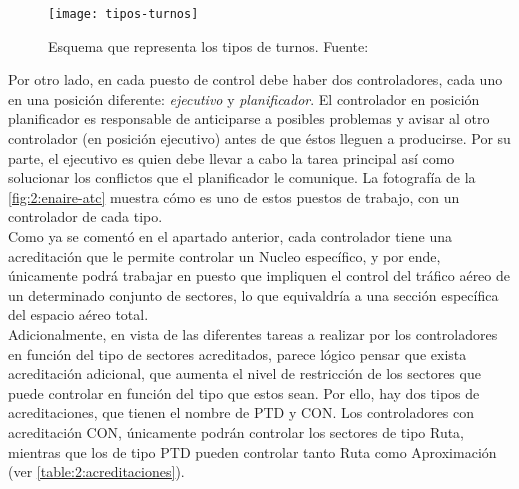 \begin{figure}
    \centering
    \texttt{[image: tipos-turnos]}
    \caption{Esquema que representa los tipos de turnos. Fuente:~\cite{articulo1}}
    \label{fig:2:tipos-turnos}
\end{figure}

Por otro lado, en cada puesto de control debe haber dos controladores, cada uno en una posición diferente: 
\textit{ejecutivo} y \textit{planificador}. El controlador en posición planificador es responsable de anticiparse a 
posibles problemas y avisar al otro controlador (en posición ejecutivo) antes de que éstos lleguen a producirse. Por su 
parte, el ejecutivo es quien debe llevar a cabo la tarea principal así como solucionar los conflictos que el 
planificador le comunique. La fotografía de la \autoref{fig:2:enaire-atc} muestra cómo es uno de estos puestos de 
trabajo, con un controlador de cada tipo.
\\

Como ya se comentó en el apartado anterior, cada controlador tiene una acreditación que le permite controlar un 
\gls{Nucleo} específico, y por ende, únicamente podrá trabajar en puesto que impliquen el control del 
tráfico aéreo de un determinado conjunto de sectores, lo que equivaldría a una sección específica del espacio aéreo 
total.
\\

Adicionalmente, en vista de las diferentes tareas a realizar por los controladores en función del tipo de sectores 
acreditados, parece lógico pensar que exista acreditación adicional, que aumenta el nivel de restricción de los 
sectores que puede controlar en función del tipo que estos sean. Por ello, hay dos tipos de acreditaciones, que tienen 
el nombre de PTD y CON. Los controladores con acreditación CON, únicamente podrán controlar los sectores de tipo Ruta, 
mientras que los de tipo PTD pueden controlar tanto Ruta como Aproximación (ver 
\autoref{table:2:acreditaciones}).

